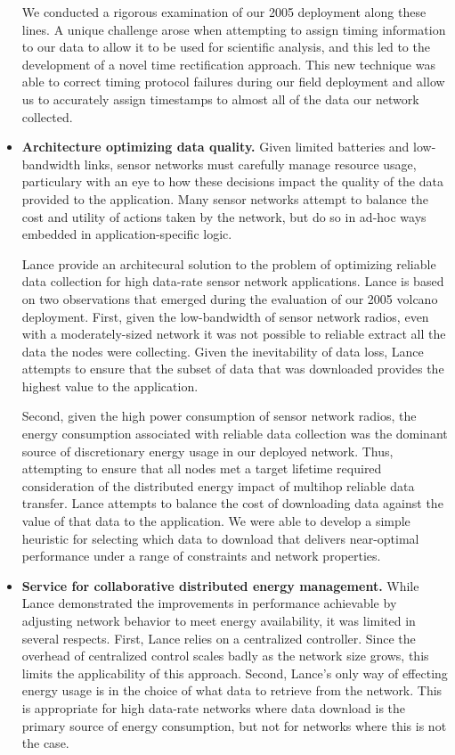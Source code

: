 \begin{itemize}
We conducted a rigorous examination of our 2005 deployment along these lines.
A unique challenge arose when attempting to assign timing information to our
data to allow it to be used for scientific analysis, and this led to the
development of a novel time rectification approach. This new technique was
able to correct timing protocol failures during our field deployment and
allow us to accurately assign timestamps to almost all of the data our
network collected.

\item \textbf{Architecture optimizing data quality.} Given limited batteries
and low-bandwidth links, sensor networks must carefully manage resource
usage, particulary with an eye to how these decisions impact the quality of
the data provided to the application. Many sensor networks attempt to balance
the cost and utility of actions taken by the network, but do so in ad-hoc
ways embedded in application-specific logic.

Lance provide an architecural solution to the problem of optimizing reliable
data collection for high data-rate sensor network applications. Lance is
based on two observations that emerged during the evaluation of our 2005
volcano deployment. First, given the low-bandwidth of sensor network radios,
even with a moderately-sized network it was not possible to reliable extract
all the data the nodes were collecting. Given the inevitability of data loss,
Lance attempts to ensure that the subset of data that was downloaded provides
the highest value to the application.

Second, given the high power consumption of sensor network radios, the energy
consumption associated with reliable data collection was the dominant source
of discretionary energy usage in our deployed network. Thus, attempting to
ensure that all nodes met a target lifetime required consideration of the
distributed energy impact of multihop reliable data transfer. Lance attempts
to balance the cost of downloading data against the value of that data to the
application. We were able to develop a simple heuristic for selecting which
data to download that delivers near-optimal performance under a range of
constraints and network properties.

\item \textbf{Service for collaborative distributed energy management.} While
Lance demonstrated the improvements in performance achievable by adjusting
network behavior to meet energy availability, it was limited in several
respects. First, Lance relies on a centralized controller. Since the overhead
of centralized control scales badly as the network size grows, this limits
the applicability of this approach. Second, Lance's only way of effecting
energy usage is in the choice of what data to retrieve from the network. This
is appropriate for high data-rate networks where data download is the primary
source of energy consumption, but not for networks where this is not the
case.


\end{itemize}
